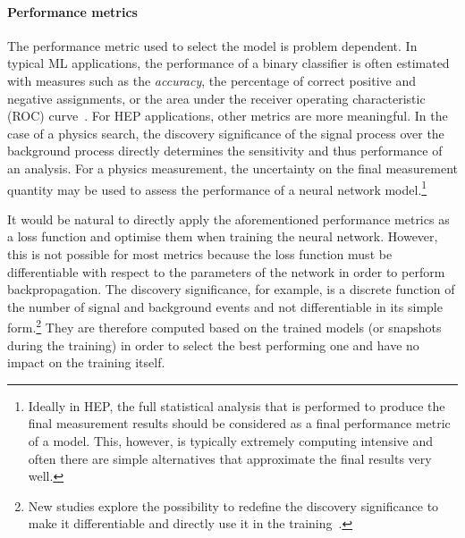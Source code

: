 \paragraph{Performance metrics}

The performance metric used to select the model is problem dependent.
In typical ML applications, the performance of a binary classifier is often estimated with measures such as the \emph{accuracy}, the percentage of correct positive and negative assignments, or the area under the receiver operating characteristic (ROC) curve~\cite{BRADLEY19971145}. 
For HEP applications, other metrics are more meaningful. In the case of a physics search, the discovery significance of the signal process over the background process directly determines the sensitivity and thus performance of an analysis. 
For a physics measurement, the uncertainty on the final measurement quantity may be used to assess the performance of a neural network model.\footnote{Ideally in HEP, the full statistical analysis that is performed to produce the final measurement results should be considered as a final performance metric of a model. This, however, is typically extremely computing intensive and often there are simple alternatives that approximate the final results very well.}

It would be natural to directly apply the aforementioned performance metrics as a loss function and optimise them when training the neural network.
However, this is not possible for most metrics because the loss function must be differentiable with respect to the parameters of the network in order to perform backpropagation. The discovery significance, for example, is a discrete function of the number of signal and background events and not differentiable in its simple form.\footnote{New studies explore the possibility to redefine the discovery significance to make it differentiable and directly use it in the training~\cite{ELWOODZ0INML}.}
They are therefore computed based on the trained models (or snapshots during the training) in order to select the best performing one and have no impact on the training itself.

